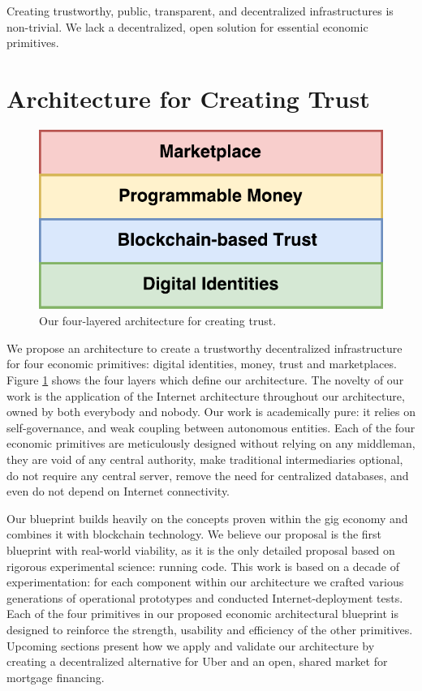\documentclass[USenglish]{article}
\begin{document}
Creating trustworthy, public, transparent, and decentralized infrastructures is non-trivial.
We lack a decentralized, open solution for essential economic primitives. 

\section{Architecture for Creating Trust}

\begin{figure}[t]
	\centering
	\includegraphics[width=1\columnwidth]{assets/tech_stack_simple}
	\caption{Our four-layered architecture for creating trust.}
	\label{fig:tech_stack_simple}
\end{figure}

We propose an architecture to create a trustworthy decentralized infrastructure for four economic primitives: digital identities, money, trust and marketplaces.
Figure \ref{fig:tech_stack_simple} shows the four layers which define our architecture.
The novelty of our work is the application of the Internet architecture throughout our architecture, owned by both everybody and nobody.
Our work is academically pure: it relies on self-governance, and weak coupling between autonomous entities. 
Each of the four economic primitives are meticulously designed without relying on any middleman, they are void of any central authority, make traditional intermediaries optional, do not require any central server, remove the need for centralized databases, and even do not depend on Internet connectivity.

Our blueprint builds heavily on the concepts proven within the gig economy and combines it with blockchain technology.
We believe our proposal is the first blueprint with real-world viability, as it is the only detailed proposal based on rigorous experimental science: running code.
This work is based on a decade of experimentation: for each component within our architecture we crafted various generations of operational prototypes and conducted Internet-deployment tests.
Each of the four primitives in our proposed economic architectural blueprint is designed to reinforce the strength, usability and efficiency of the other primitives. 
Upcoming sections present how we apply and validate our architecture by creating a decentralized alternative for Uber and an open, shared market for mortgage financing.
\end{document}
